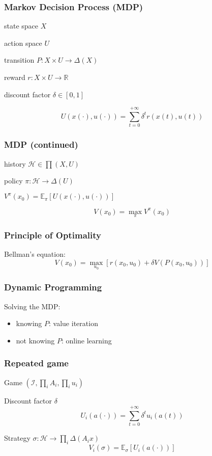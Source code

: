 
\begin{framestruct}
\end{framestruct}

\begin{frame}
  \frametitle{Markov Decision Process (MDP)}
  \pause
  state space $X$

  action space $U$

  transition $P:X\times U \to \Delta(X)$

  reward $r:X \times U \to \mathbb{R}$

  discount factor $\delta \in [0,1]$


  \pause
  \bigskip
  \[U(x(\cdot), u(\cdot)) = \sum_{t=0}^{+\infty} \delta^t r(x(t), u(t))\]
\end{frame}

\begin{frame}
  \frametitle{MDP (continued)}
  history $\mathcal{H} \in \prod (X,U)$

  policy $\pi: \mathcal{H} \to \Delta(U)$

  \pause
  $V^\pi(x_0) = \mathbb{E}_{\pi}\left[U(x(\cdot), u(\cdot))\right]$

  \pause
  \[V(x_0) = \max_{\pi} V^\pi(x_0)\]

\end{frame}

\begin{frame}
  \frametitle{Principle of Optimality}

  Bellman's equation:
  \[V(x_0) = \max_{u_0} \left[r(x_0, u_0) + \delta V(P(x_0, u_0))\right]\]
\end{frame}

\begin{frame}
  \frametitle{Dynamic Programming}

  Solving the MDP:
  \begin{itemize}
  \pause \item knowing $P$: value iteration
  \pause \item not knowing $P$: online learning
  \end{itemize}

\end{frame}

\begin{frame}
  \frametitle{Repeated game}
  \pause
  Game $(\mathcal{I}, \prod_i A_i, \prod_i u_i)$

  \pause
  Discount factor $\delta$
  \[U_i(a(\cdot)) = \sum_{t=0}^{+\infty} \delta^t u_i(a(t))\]

  \pause
  Strategy $\sigma: \mathcal{H} \to \prod_i \Delta(A_ix)$
  \[V_i(\sigma) = \mathbb{E}_{\sigma}\left[U_i(a(\cdot))\right]\]
\end{frame}

